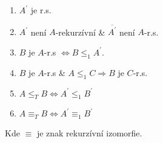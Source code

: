 \begin{theorem}
	\begin{enumerate}
		\item $A^{\prime}$ je r.s.
		\item $A^{\prime}$ není $A$-rekurzívní \& $\overline{A^{\prime}}$ není $A$-r.s.
		\item $B$ je $A$-r.s $\iff B \leq_1 A^{\prime}$.
		\item $B$ je $A$-r.s \& $A \leq_1 C \Rightarrow B$ je $C$-r.s.
		\item $A \leq_T B \iff A^{\prime} \leq_1 B^{\prime}$
		\item $A \equiv_T B \iff A^{\prime} \equiv_1 B^{\prime}$
	\end{enumerate}

	Kde $\equiv$ je znak rekurzívní izomorfie.
\end{theorem}
